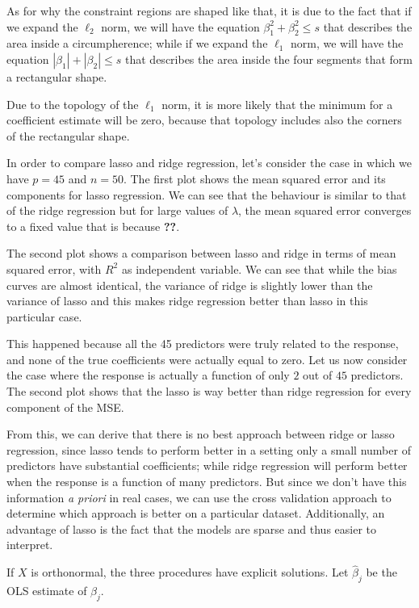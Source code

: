 As for why the constraint regions are shaped like that, it is due to the fact that if we expand the $\ell_2$ norm, we will have the equation $\beta_1^2 + \beta_2^2 \leq s$ that describes the area inside a circumpherence; while if we expand the $\ell_1$ norm, we will have the equation $|\beta_1| + |\beta_2| \leq s$ that describes the area inside the four segments that form a rectangular shape.

Due to the topology of the $\ell_1$ norm, it is more likely that the minimum for a coefficient estimate will be zero, because that topology includes also the corners of the rectangular shape.

In order to compare lasso and ridge regression, let's consider the case in which we have $p=45$ and $n=50$. The first plot shows the mean squared error and its components for lasso regression. We can see that the behaviour is similar to that of the ridge regression but for large values of $\lambda$, the mean squared error converges to a fixed value that is because \textbf{??}.

The second plot shows a comparison between lasso and ridge in terms of mean squared error, with $R^2$ as independent variable. We can see that while the bias curves are almost identical, the variance of ridge is slightly lower than the variance of lasso and this makes ridge regression better than lasso in this particular case.

This happened because all the 45 predictors were truly related to the response, and none of the true coefficients were actually equal to zero. Let us now consider the case where the response is actually a function of only $2$ out of $45$ predictors. The second plot shows that the lasso is way better than ridge regression for every component of the MSE.

From this, we can derive that there is no best approach between ridge or lasso regression, since lasso tends to perform better in a setting only a small number of predictors have substantial coefficients; while ridge regression will perform better when the response is a function of many predictors. But since we don't have this information \textit{a priori} in real cases, we can use the cross validation approach to determine which approach is better on a particular dataset. Additionally, an advantage of lasso is the fact that the models are sparse and thus easier to interpret.


If $X$ is orthonormal, the three procedures have explicit solutions. Let $\hat{\beta}_j$ be the OLS estimate of $\beta_j$.

